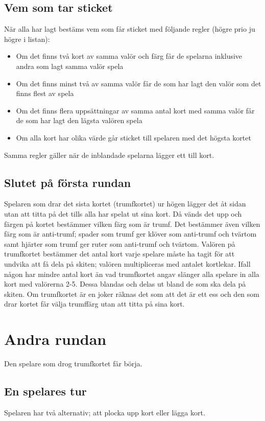 \documentclass[a4paper,12pt]{article}
\begin{document}
\subsection{Vem som tar sticket}
När alla har lagt bestäms vem som får sticket med följande regler (högre prio ju högre i listan):
\begin{itemize}
  \item Om det finns två kort av samma valör och färg får de spelarna inklusive andra som lagt samma valör spela
  \item Om det finns minst två av samma valör får de som har lagt den valör som det finns flest av spela
  \item Om det finns flera uppsättningar av samma antal kort med samma valör får de som har lagt den lägsta valören spela
  \item Om alla kort har olika värde går sticket till spelaren med det högsta kortet
\end{itemize}
Samma regler gäller när de inblandade spelarna lägger ett till kort.

\subsection{Slutet på första rundan}
Spelaren som drar det sista kortet (trumfkortet) ur högen lägger det åt sidan utan att titta på det tills alla har spelat ut sina kort. Då vänds det upp och färgen på kortet bestämmer vilken färg som är trumf. Det bestämmer även vilken färg som är anti-trumf; spader som trumf ger klöver som anti-trumf och tvärtom samt hjärter som trumf ger ruter som anti-trumf och tvärtom. Valören på trumfkortet bestämmer det antal kort varje spelare måste ha tagit för att undvika att få dela på skiten; valören multipliceras med antalet kortlekar. Ifall någon har mindre antal kort än vad trumfkortet angav slänger alla spelare in alla kort med valörerna 2-5. Dessa blandas och delas ut bland de som ska dela på skiten. Om trumfkortet är en joker räknas det som att det är ett ess och den som drar kortet får välja trumffärg utan att titta på sina kort.

\section{Andra rundan}
Den spelare som drog trumfkortet får börja.

\subsection{En spelares tur}
Spelaren har två alternativ; att plocka upp kort eller lägga kort.
\end{document}
